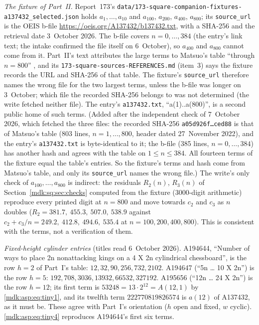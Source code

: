 \documentclass[11pt,letterpaper]{article}
\numberwithin{equation}{section}
\theoremstyle{remark}\newtheorem{remark}[theorem]{Remark}
\newcommand{\file}[1]{\nolinkurl{#1}}
\begin{document}
\emph{The fixture of Part~II.} Report~173's \file{data/173-square-companion-fixtures-a137432_selected.json} holds $a_1,\dots,a_{10}$ and $a_{100}$, $a_{200}$, $a_{400}$, $a_{800}$; its \texttt{source\_url} is the OEIS b-file \url{https://oeis.org/A137432/b137432.txt}, with a SHA-256 and the retrieval date 3~October 2026. The b-file covers $n=0,\dots,384$ (the entry's link text; the intake confirmed the file itself on 6~October), so $a_{400}$ and $a_{800}$ cannot come from it. Part~II's text attributes the large terms to Matsuo's table ``through $n=800$'' \cite{matsuoTable}, and its \file{173-square-sources-REFERENCES.md} (item~3) says the fixture records the URL and SHA-256 of that table. The fixture's \texttt{source\_url} therefore names the wrong file for the two largest terms, unless the b-file was longer on 3~October; which file the recorded SHA-256 belongs to was not determined (the write fetched neither file). The entry's \file{a137432.txt}, ``a(1)..a(800)'', is a second public home of such terms. \textup{(Added after the independent check of 7~October 2026, which fetched the three files: the recorded SHA-256 \texttt{a05d926f\dots ced88} is that of Matsuo's table \cite{matsuoTable} (803 lines, $n=1,\dots,800$, header dated 27~November 2022), and the entry's \file{a137432.txt} is byte-identical to it; the b-file (385 lines, $n=0,\dots,384$) has another hash and agrees with the table on $1\le n\le384$. All fourteen terms of the fixture equal the table's entries. So the fixture's terms and hash come from Matsuo's table, and only its \texttt{source\_url} names the wrong file.)} The write's only check of $a_{100},\dots,a_{800}$ is indirect: the residuals $R_2(n)$, $R_3(n)$ of Section~\ref{mdk:sq:sec:checks} computed from the fixture (3000-digit arithmetic) reproduce every printed digit at $n=800$ and move towards $c_2$ and $c_3$ as $n$ doubles ($R_2=381.7,\ 455.3,\ 507.0,\ 538.9$ against $c_2+c_3/n=249.2,\ 412.8,\ 494.6,\ 535.4$ at $n=100,200,400,800$). This is consistent with the terms, not a verification of them.

\emph{Fixed-height cylinder entries} (titles read 6~October 2026). A194644, ``Number of ways to place 2n nonattacking kings on a 4 X 2n cylindrical chessboard'', is the row $h=2$ of Part~I's table: $12,32,90,256,732,2102$. A194647 (``5n \dots{} 10 X 2n'') is the row $h=5$: $192,708,3036,13932,66532,327192$. A195656 (``12n \dots{} 24 X 2n'') is the row $h=12$; its first term is $53248=13\cdot2^{12}=A(12,1)$ by \eqref{mdk:asp:eq:tiny1}, and its twelfth term $222770819826574$ is $a(12)$ of A137432, as it must be. These agree with Part~I's orientation ($h$ open and fixed, $w$ cyclic). \eqref{mdk:asp:eq:tiny4} reproduces A194644's first six terms.
\end{document}
